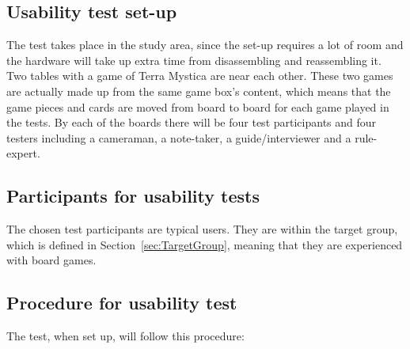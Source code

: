 \subsection{Usability test set-up}
The test takes place in the study area, since the set-up requires a lot of room and the hardware will take up extra time from disassembling and reassembling it. Two tables with a game of Terra Mystica are near each other. These two games are actually made up from the same game box's content, which means that the game pieces and cards are moved from board to board for each game played in the tests. By each of the boards there will be four test participants and four testers including a cameraman, a note-taker, a guide/interviewer and a rule-expert.

\subsection{Participants for usability tests}
The chosen test participants are typical users. They are within the target group, which is defined in Section~\ref{sec:TargetGroup}, meaning that they are experienced with board games. 

\subsection{Procedure for usability test}
The test, when set up, will follow this procedure: 

